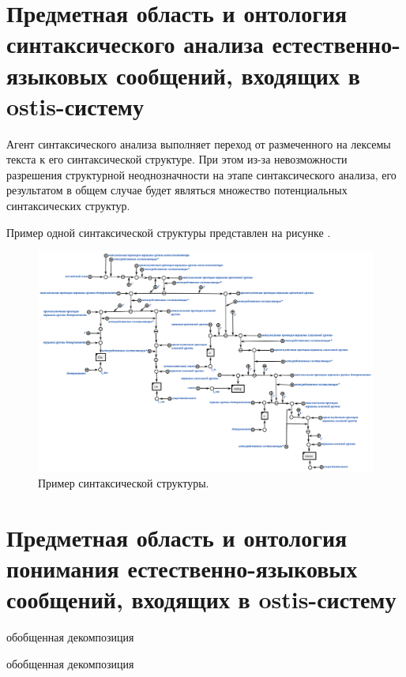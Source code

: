 \section{Предметная область и онтология синтаксического анализа естественно-языковых сообщений, входящих в ostis-систему}

Агент синтаксического анализа выполняет переход от размеченного на лексемы текста к его синтаксической структуре.
При этом из-за невозможности разрешения структурной неоднозначности на этапе синтаксического анализа, его результатом в общем случае будет являться множество потенциальных синтаксических структур.

Пример одной синтаксической структуры представлен на рисунке \textit{}.

\begin{figure}[h]
    \centering
    \includegraphics[width=\textwidth]{images/part4/chapter_nl_interfaces/syntactic.png}
    \caption{Пример синтаксической структуры.}
    \label{fig:syntactic_result}
\end{figure}


\section{Предметная область и онтология понимания естественно-языковых сообщений, входящих в ostis-систему}

\begin{SCn}

    \begin{scnrelfromset}{обобщенная декомпозиция}
        \begin{scnindent}
            \begin{scnrelfromset}{обобщенная декомпозиция}
            \end{scnrelfromset}
        \end{scnindent}
    \end{scnrelfromset}

\end{SCn}

